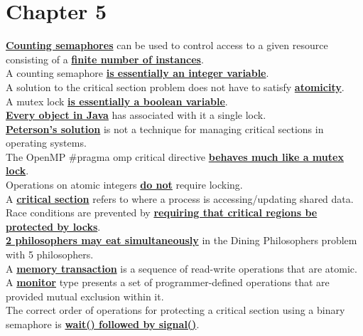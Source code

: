 \documentclass[10pt]{article}
\newcommand{\qw}[1]{\textbf{\ul{#1}}}
\begin{document}
\section*{\centering Chapter 5}
\qw{Counting semaphores} can be used to control access to a given resource consisting of a \qw{finite number of instances}.\\[2mm]
A counting semaphore \qw{is essentially an integer variable}.\\[2mm]
A solution to the critical section problem does not have to satisfy \qw{atomicity}.\\[2mm]
A mutex lock \qw{is essentially a boolean variable}.\\[2mm]
\qw{Every object in Java} has associated with it a single lock.\\[2mm]
\qw{Peterson's solution} is not a technique for managing critical sections in operating systems.\\[2mm]
The OpenMP #pragma omp critical directive \qw{behaves much like a mutex lock}.\\[2mm]
Operations on atomic integers \qw{do not} require locking.\\[2mm]
A \qw{critical section} refers to where a process is accessing/updating shared data.\\[2mm]
Race conditions are prevented by \qw{requiring that critical regions be protected by locks}.\\[2mm]
\qw{2 philosophers may eat simultaneously} in the Dining Philosophers problem with 5 philosophers.\\[2mm]
A \qw{memory transaction} is a sequence of read-write operations that are atomic.\\[2mm]
A \qw{monitor} type presents a set of programmer-defined operations that are provided mutual exclusion within it.\\[2mm]
The correct order of operations for protecting a critical section using a binary semaphore is \qw{wait() followed by signal()}.
\newpage
\end{document}
